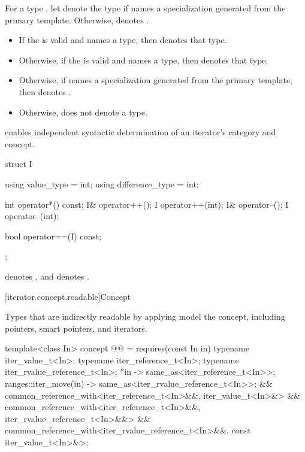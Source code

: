 \pnum
For a type , let  denote
the type  if  names
a specialization generated from the primary template.
Otherwise,  denotes
.
\begin{itemize}
\item If the 
   is valid
  and names a type, then  denotes that
  type.
\item Otherwise, if the 
  is valid and names a type, then 
  denotes that type.
\item Otherwise, if  names a specialization generated
  from the primary template, then 
  denotes .
\item Otherwise,  does not denote a type.
\end{itemize}

\pnum
\begin{note}
 enables independent syntactic determination
of an iterator's category and concept.
\end{note}
\begin{example}
\begin{codeblock}
struct I {
  using value_type = int;
  using difference_type = int;

  int operator*() const;
  I& operator++();
  I operator++(int);
  I& operator--();
  I operator--(int);

  bool operator==(I) const;
};
\end{codeblock}
 denotes ,
and  denotes .
\end{example}

[iterator.concept.readable]{Concept }

\pnum
Types that are indirectly readable by applying 
model the  concept, including
pointers, smart pointers, and iterators.

\begin{codeblock}
template<class In>
  concept @@ =
    requires(const In in) {
      typename iter_value_t<In>;
      typename iter_reference_t<In>;
      typename iter_rvalue_reference_t<In>;
      { *in } -> same_as<iter_reference_t<In>>;
      { ranges::iter_move(in) } -> same_as<iter_rvalue_reference_t<In>>;
    } &&
    common_reference_with<iter_reference_t<In>&&, iter_value_t<In>&> &&
    common_reference_with<iter_reference_t<In>&&, iter_rvalue_reference_t<In>&&> &&
    common_reference_with<iter_rvalue_reference_t<In>&&, const iter_value_t<In>&>;
\end{codeblock}

